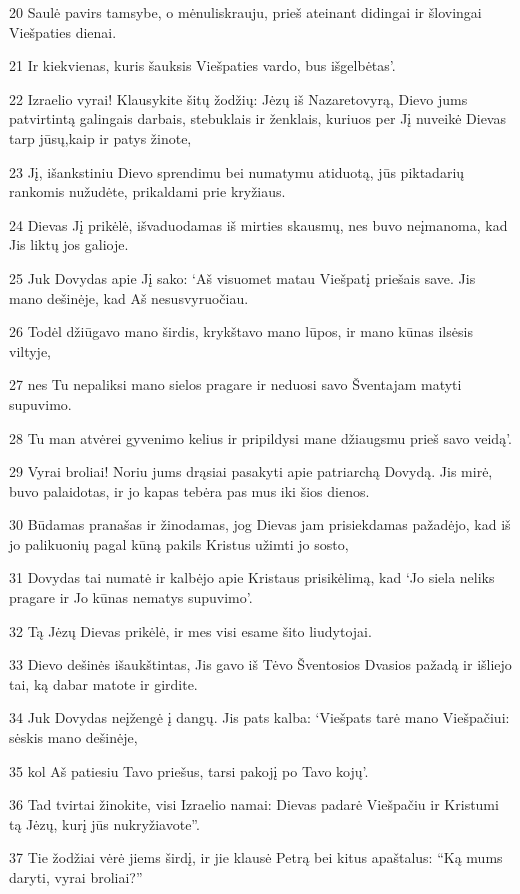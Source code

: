 \par 20 Saulė pavirs tamsybe, o mėnulis­krauju, prieš ateinant didingai ir šlovingai Viešpaties dienai. 
\par 21 Ir kiekvienas, kuris šauksis Viešpaties vardo, bus išgelbėtas’. 
\par 22 Izraelio vyrai! Klausykite šitų žodžių: Jėzų iš Nazareto­vyrą, Dievo jums patvirtintą galingais darbais, stebuklais ir ženklais, kuriuos per Jį nuveikė Dievas tarp jūsų,­kaip ir patys žinote,­ 
\par 23 Jį, išankstiniu Dievo sprendimu bei numatymu atiduotą, jūs piktadarių rankomis nužudėte, prikaldami prie kryžiaus. 
\par 24 Dievas Jį prikėlė, išvaduodamas iš mirties skausmų, nes buvo neįmanoma, kad Jis liktų jos galioje. 
\par 25 Juk Dovydas apie Jį sako: ‘Aš visuomet matau Viešpatį priešais save. Jis mano dešinėje, kad Aš nesusvyruočiau. 
\par 26 Todėl džiūgavo mano širdis, krykštavo mano lūpos, ir mano kūnas ilsėsis viltyje, 
\par 27 nes Tu nepaliksi mano sielos pragare ir neduosi savo Šventajam matyti supuvimo. 
\par 28 Tu man atvėrei gyvenimo kelius ir pripildysi mane džiaugsmu prieš savo veidą’. 
\par 29 Vyrai broliai! Noriu jums drąsiai pasakyti apie patriarchą Dovydą. Jis mirė, buvo palaidotas, ir jo kapas tebėra pas mus iki šios dienos. 
\par 30 Būdamas pranašas ir žinodamas, jog Dievas jam prisiekdamas pažadėjo, kad iš jo palikuonių pagal kūną pakils Kristus užimti jo sosto, 
\par 31 Dovydas tai numatė ir kalbėjo apie Kristaus prisikėlimą, kad ‘Jo siela neliks pragare ir Jo kūnas nematys supuvimo’. 
\par 32 Tą Jėzų Dievas prikėlė, ir mes visi esame šito liudytojai. 
\par 33 Dievo dešinės išaukštintas, Jis gavo iš Tėvo Šventosios Dvasios pažadą ir išliejo tai, ką dabar matote ir girdite. 
\par 34 Juk Dovydas neįžengė į dangų. Jis pats kalba: ‘Viešpats tarė mano Viešpačiui: sėskis mano dešinėje, 
\par 35 kol Aš patiesiu Tavo priešus, tarsi pakojį po Tavo kojų’. 
\par 36 Tad tvirtai žinokite, visi Izraelio namai: Dievas padarė Viešpačiu ir Kristumi tą Jėzų, kurį jūs nukryžiavote”. 
\par 37 Tie žodžiai vėrė jiems širdį, ir jie klausė Petrą bei kitus apaštalus: “Ką mums daryti, vyrai broliai?” 
